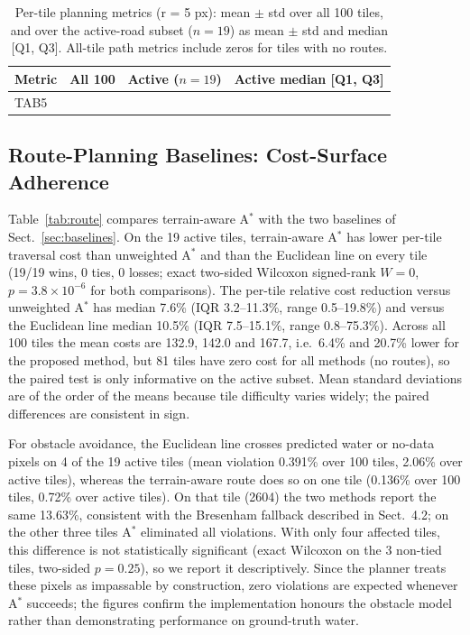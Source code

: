 \documentclass[runningheads]{llncs}
\begin{document}
\begin{table}[t]
\caption{Per-tile planning metrics (r = 5 px): mean $\pm$ std over all 100 tiles, and over the active-road subset ($n=19$) as mean $\pm$ std and median [Q1, Q3]. All-tile path metrics include zeros for tiles with no routes.}\label{tab:n100}
\centering
\scriptsize
\setlength{\tabcolsep}{3pt}
\begin{tabular}{lrrr}
\toprule
Metric & All 100 & Active ($n=19$) & Active median [Q1, Q3]\\
\midrule
{{TAB5}}
\bottomrule
\end{tabular}
\end{table}

\subsection{Route-Planning Baselines: Cost-Surface Adherence}
Table~\ref{tab:route} compares terrain-aware A$^{*}$ with the two baselines of Sect.~\ref{sec:baselines}. On the 19 active tiles, terrain-aware A$^{*}$ has lower per-tile traversal cost than unweighted A$^{*}$ and than the Euclidean line on every tile (19/19 wins, 0 ties, 0 losses; exact two-sided Wilcoxon signed-rank $W=0$, $p=3.8\times10^{-6}$ for both comparisons). The per-tile relative cost reduction versus unweighted A$^{*}$ has median 7.6\% (IQR 3.2--11.3\%, range 0.5--19.8\%) and versus the Euclidean line median 10.5\% (IQR 7.5--15.1\%, range 0.8--75.3\%). Across all 100 tiles the mean costs are 132.9, 142.0 and 167.7, i.e.\ 6.4\% and 20.7\% lower for the proposed method, but 81 tiles have zero cost for all methods (no routes), so the paired test is only informative on the active subset. Mean standard deviations are of the order of the means because tile difficulty varies widely; the paired differences are consistent in sign.

For obstacle avoidance, the Euclidean line crosses predicted water or no-data pixels on 4 of the 19 active tiles (mean violation 0.391\% over 100 tiles, 2.06\% over active tiles), whereas the terrain-aware route does so on one tile (0.136\% over 100 tiles, 0.72\% over active tiles). On that tile (2604) the two methods report the same 13.63\%, consistent with the Bresenham fallback described in Sect.~4.2; on the other three tiles A$^{*}$ eliminated all violations. With only four affected tiles, this difference is not statistically significant (exact Wilcoxon on the 3 non-tied tiles, two-sided $p=0.25$), so we report it descriptively. Since the planner treats these pixels as impassable by construction, zero violations are expected whenever A$^{*}$ succeeds; the figures confirm the implementation honours the obstacle model rather than demonstrating performance on ground-truth water.
\end{document}
